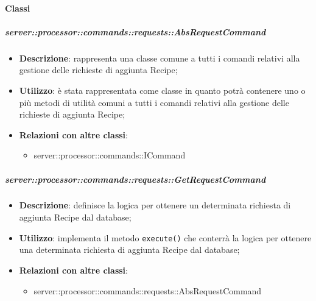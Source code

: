         \paragraph{Classi} %

        \subparagraph{server::processor::commands::requests::AbsRequestCommand} %
        \label{subp:bdsm_app_server_processor_commands_requests_absrequestcommand}
        \begin{itemize}
          \item \textbf{Descrizione}: rappresenta una classe comune a tutti i comandi relativi alla gestione delle richieste di aggiunta Recipe;
          \item \textbf{Utilizzo}: è stata rappresentata come classe in quanto potrà contenere uno o più metodi di utilità comuni a tutti i comandi relativi alla gestione delle richieste di aggiunta Recipe;
          \item \textbf{Relazioni con altre classi}:
            \begin{itemize}
              \item server::processor::commands::ICommand
            \end{itemize}
        \end{itemize}

        \subparagraph{server::processor::commands::requests::GetRequestCommand} %
        \label{subp:bdsm_app_server_processor_commands_requests_getrequestcommand}
        \begin{itemize}
          \item \textbf{Descrizione}: definisce la logica per ottenere un determinata richiesta di aggiunta Recipe dal database;
          \item \textbf{Utilizzo}: implementa il metodo \texttt{execute()} che conterrà la logica per ottenere una determinata richiesta di aggiunta Recipe dal database;
          \item \textbf{Relazioni con altre classi}:
            \begin{itemize}
              \item server::processor::commands::requests::AbsRequestCommand
            \end{itemize}
        \end{itemize}

